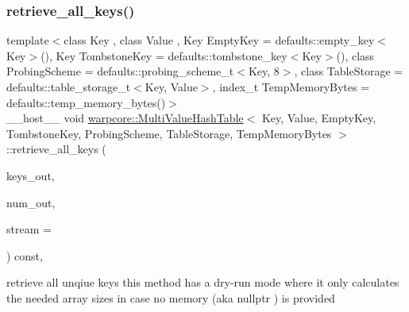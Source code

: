 \subsubsection{\texorpdfstring{retrieve\+\_\+all\+\_\+keys()}{retrieve\_all\_keys()}}
{\footnotesize\ttfamily template$<$class Key , class Value , Key Empty\+Key = defaults\+::empty\+\_\+key$<$\+Key$>$(), Key Tombstone\+Key = defaults\+::tombstone\+\_\+key$<$\+Key$>$(), class Probing\+Scheme  = defaults\+::probing\+\_\+scheme\+\_\+t$<$\+Key, 8$>$, class Table\+Storage  = defaults\+::table\+\_\+storage\+\_\+t$<$\+Key, Value$>$, index\+\_\+t Temp\+Memory\+Bytes = defaults\+::temp\+\_\+memory\+\_\+bytes()$>$ \\
\+\_\+\+\_\+host\+\_\+\+\_\+ void \hyperlink{classwarpcore_1_1MultiValueHashTable}{warpcore\+::\+Multi\+Value\+Hash\+Table}$<$ Key, Value, Empty\+Key, Tombstone\+Key, Probing\+Scheme, Table\+Storage, Temp\+Memory\+Bytes $>$\+::retrieve\+\_\+all\+\_\+keys (\begin{DoxyParamCaption}\item[{key\+\_\+type $\ast$const}]{keys\+\_\+out,  }\item[{index\+\_\+type \&}]{num\+\_\+out,  }\item[{const cuda\+Stream\+\_\+t}]{stream = {} }\end{DoxyParamCaption}) const\hspace{0.3cm}{\ttfamily [inline]}, {\ttfamily [noexcept]}}



retrieve all unqiue keys  this method has a dry-\/run mode where it only calculates the needed array sizes in case no memory (aka {\ttfamily nullptr} ) is provided 


